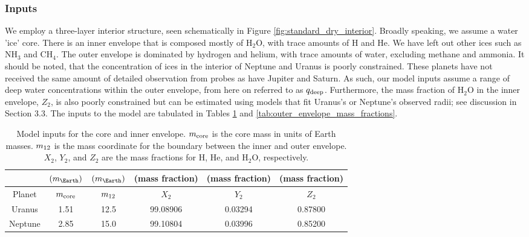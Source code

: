 \documentclass[11pt]{ucscthesisbs}
\begin{document}
\subsubsection{Inputs}
We employ a three-layer interior structure, seen schematically in Figure \ref{fig:standard_dry_interior}. Broadly speaking, we assume a water 'ice' core. There is an inner envelope that is composed mostly of H$_{2}$O, with trace amounts of H and He. We have left out other ices such as NH$_{3}$ and CH$_{4}$. The outer envelope is dominated by hydrogen and helium, with trace amounts of water, excluding methane and ammonia. It should be noted, that the concentration of ices in the interior of Neptune and Uranus is poorly constrained. These planets have not received the same amount of detailed observation from probes as have Jupiter and Saturn. As such, our model inputs assume a range of deep water concentrations within the outer envelope, from here on referred to as $q_{\rm deep}$. Furthermore, the mass fraction of H$_{2}$O in the inner envelope, $Z_{2}$, is also poorly constrained but can be estimated using models that fit Uranus's or Neptune's observed radii; see discussion in Section 3.3. The inputs to the model are tabulated in Tables \ref{tab:core_mass_and_inner_envelope_mass_fractions} and \ref{tab:outer_envelope_mass_fractions}.


{}
\begin{table}[]
\centering
\begin{tabular}{cccccc}
                              & $(m_{\Earth})$                      & $(m_{\Earth})$                    & (mass fraction)               & (mass fraction)              & (mass fraction)              \\ \hline
\multicolumn{1}{|c|}{Planet}  & \multicolumn{1}{c|}{$m_{\rm core}$} & \multicolumn{1}{c|}{$m_{\rm 12}$} & \multicolumn{1}{c|}{$X_{2}$}  & \multicolumn{1}{c|}{$Y_{2}$} & \multicolumn{1}{c|}{$Z_{2}$} \\ \hline
\multicolumn{1}{|c|}{Uranus}  & \multicolumn{1}{c|}{1.51}           & \multicolumn{1}{c|}{12.5}         & \multicolumn{1}{c|}{99.08906} & \multicolumn{1}{c|}{0.03294} & \multicolumn{1}{c|}{0.87800} \\ \hline
\multicolumn{1}{|c|}{Neptune} & \multicolumn{1}{c|}{2.85}           & \multicolumn{1}{c|}{15.0}         & \multicolumn{1}{c|}{99.10804} & \multicolumn{1}{c|}{0.03996} & \multicolumn{1}{c|}{0.85200} \\ \hline
\end{tabular}
\caption{Model inputs for the core and inner envelope. $m_{\rm core}$ is the core mass in units of Earth masses. $m_{\rm 12}$ is the mass coordinate for the boundary between the inner and outer envelope. $X_{2}$, $Y_{2}$, and $Z_{2}$ are the mass fractions for H, He, and H$_{2}$O, respectively.}
\label{tab:core_mass_and_inner_envelope_mass_fractions}
\end{table}
\end{document}
